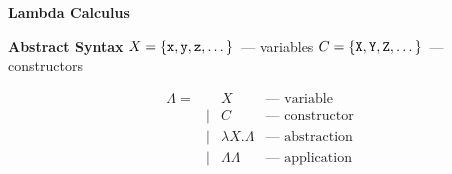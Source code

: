 \centering

{\large\textbf{Lambda Calculus}}
\vskip1.5cm

\textbf{Abstract Syntax}
\vskip 7mm
$X=\{\mbox{\texttt{x}}, \mbox{\texttt{y}}, \mbox{\texttt{z}}, \dots\}$~--- variables
\vskip 7mm
$C=\{\mbox{\texttt{X}}, \mbox{\texttt{Y}}, \mbox{\texttt{Z}}, \dots\}$~--- constructors

$$
\begin{array}{rrcl}
\Lambda = &      & X                   & \mbox{--- variable}\\
          & \mid & C                   & \mbox{--- constructor}\\
          & \mid & \lambda X . \Lambda & \mbox{--- abstraction}\\
          & \mid & \Lambda \Lambda     & \mbox{--- application}
\end{array}
$$

